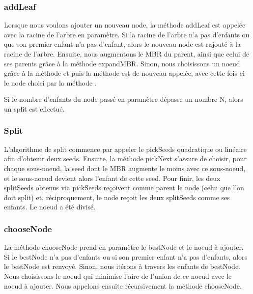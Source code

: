\documentclass[utf8]{article}
\begin{document}
\begin{large}
    \subsubsection{addLeaf}\label{addLeaf}
    \indent
    \par
    Lorsque nous voulons ajouter un nouveau node, la méthode addLeaf est appelée
    avec la racine de l'arbre en paramètre. Si la racine de l'arbre n'a pas
    d'enfants ou que son premier enfant n'a pas d'enfant, alors le nouveau node
    est rajouté à la racine de l'arbre. Ensuite, nous augmentons le MBR du parent,
    ainsi que celui de ses parents grâce à la méthode expandMBR. Sinon, nous
    choisissons un noeud grâce à la méthode  et puis la méthode 
    est de nouveau appelée, avec cette fois-ci le node choisi par la méthode
    .
    \par
    \indent
    Si le nombre d'enfants du node passé en paramètre dépasse un nombre N, alors
    un split est effectué.
    \par
    \subsubsection{Split}\label{split}
    \indent
    \par
    L'algorithme de split commence par appeler le pickSeeds quadratique ou
    linéaire afin d'obtenir deux seeds. \newline Ensuite, la
    méthode pickNext s'assure de choisir, pour chaque sous-noeud, la seed dont le
    MBR augmente le moins avec ce sous-noeud, et le sous-noeud devient alors
    l'enfant de cette seed. \newline Pour finir, les deux splitSeeds obtenus via
    pickSeeds reçoivent comme parent le node (celui que l'on doit split) et,
    réciproquement, le node reçoit les deux splitSeeds comme ses enfants. Le noeud
    a été divisé.
    \par

    \subsubsection{chooseNode}\label{chooseNode}
    \indent
    \par
    La méthode chooseNode prend en paramètre le bestNode et le noeud à ajouter.
    Si le bestNode n'a pas d'enfants ou si son premier enfant n'a pas d'enfants,
    alors le bestNode est renvoyé. Sinon, nous itérons à travers les enfants de
    bestNode. Nous choisissons le noeud qui minimise l'aire de l'union de ce noeud avec le noeud à ajouter. Nous appelons ensuite récursivement la méthode chooseNode.


\end{large}
\end{document}
